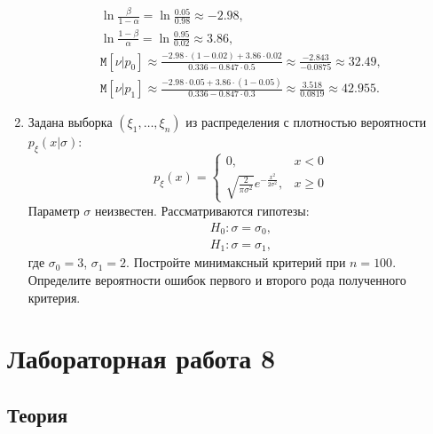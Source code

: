 \documentclass[a4paper,12pt]{article}
\newcommand{\cexpectation}[2]{\texttt{M} \left[ #1 | #2 \right]}
\begin{document}
\begin{enumerate}
            \begin{gather*}
                  \ln \frac{\beta}{1-\alpha} = \ln \frac{0.05}{0.98} \approx -2.98 , \\
                  \ln \frac{1-\beta}{\alpha} = \ln \frac{0.95}{0.02} \approx 3.86 , \\
                  \cexpectation{\nu}{p_0}
                  \approx \frac{-2.98 \cdot (1-0.02) + 3.86 \cdot 0.02}{0.336 - 0.847 \cdot 0.5}
                  \approx \frac{-2.843}{-0.0875}
                  \approx 32.49 , \\
                  \cexpectation{\nu}{p_1}
                  \approx \frac{-2.98 \cdot 0.05 + 3.86 \cdot (1-0.05)}{0.336 - 0.847 \cdot 0.3}
                  \approx \frac{3.518}{0.0819}
                  \approx 42.955 .
            \end{gather*}

      \item Задана выборка $\left( \xi_1, \dots, \xi_n \right)$ из распределения с плотностью вероятности $p_\xi(x | \sigma)$:
            \[
                  p_\xi(x) = \left \{
                  \begin{array}{ll}
                        0,                                                         & x < 0   \\
                        \sqrt{\frac{2}{\pi \sigma^2}} e^{-\frac{x^2}{2 \sigma^2}}, & x \ge 0
                  \end{array}
                  \right .
            \]
            Параметр $\sigma$ неизвестен. Рассматриваются гипотезы:
            \begin{gather*}
                  H_0: \sigma = \sigma_0 , \\
                  H_1: \sigma = \sigma_1 ,
            \end{gather*}
            где $\sigma_0 = 3$, $\sigma_1 = 2$. Постройте минимаксный критерий при $n = 100$. Определите вероятности ошибок первого и второго рода
            полученного критерия.
\end{enumerate}

\section*{Лабораторная работа 8}

\subsection*{Теория}
\end{document}
